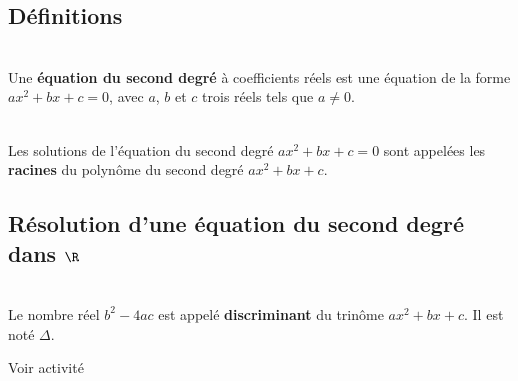 \documentclass[11 pt, a4paper]{article}
\begin{document}
	\subsection{Définitions}

\begin{Df} ~\\	
Une \textbf{équation du second degré} à coefficients réels est une équation de la forme $ax^2+bx+c=0$, avec $a$, $b$ et $c$ trois réels tels que $a\neq 0$.
\end{Df}	

\begin{Df} ~\\	
Les solutions de l'équation du second degré $ax^2+bx+c=0$ sont appelées les \textbf{racines} du polynôme du second degré $ax^2+bx+c$.
\end{Df}	


	\subsection{Résolution d'une équation du second degré dans $\R$}

\begin{Df} ~\\	
Le nombre réel $b^2-4ac$ est appelé \textbf{discriminant} du trinôme $ax^2+bx+c$. Il est noté $\Delta$.
\end{Df}



\begin{DmI} Voir activité 
%
%
%
%
\end{DmI}
\end{document}
